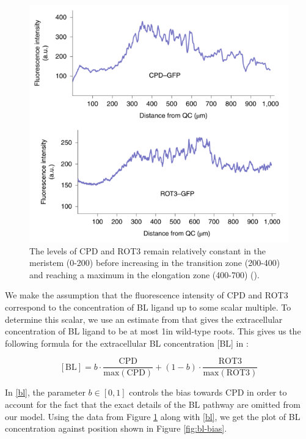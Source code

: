 \begin{figure}[!htbp]
    \centering
    \includegraphics[width=13cm]{img/cpd-rot3.png}
    \caption{The levels of CPD and ROT3 remain relatively constant in the meristem (0-200\um) before increasing in the transition zone (200-400\um) and reaching a maximum in the elongation zone (400-700\um) (\cite{vukasinovic2021}).}
    \label{fig:cpd-rot3-levels}
\end{figure}

\medskip

We make the assumption that the fluorescence intensity of CPD and ROT3 correspond to the concentration of BL ligand up to some scalar multiple.  To determine this scalar, we use an estimate from \cite{vanesse2012} that gives the extracellular concentration of BL ligand to be at most 1\nm in wild-type roots. This gives us the following formula for the extracellular BL concentration [BL] in \nm:


\begin{equation}
    \label{bl}
[\text{BL}] = b \cdot \frac{\text{CPD}}{\text{max}(\text{CPD})} + (1 - b) \cdot \frac{\text{ROT3}}{\text{max}(\text{ROT3})}
\end{equation}

\medskip

In \eqref{bl}, the parameter $b \in [0, 1]$ controls the bias towards CPD in order to account for the fact that the exact details of the BL pathway are omitted from our model. Using the data from Figure \ref{fig:cpd-rot3-levels} along with \eqref{bl}, we get the plot of BL concentration against position shown in Figure \ref{fig:bl-bias}.

